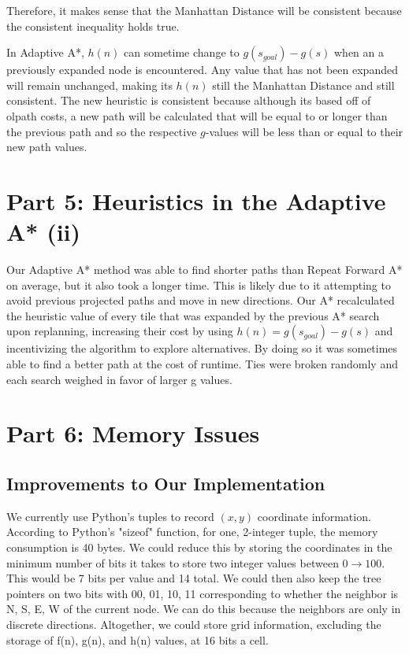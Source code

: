 \documentclass[a4paper,12pt]{article}
\begin{document}
Therefore, it makes sense that the Manhattan Distance will be consistent because the consistent inequality holds true. 

In Adaptive A*, $h(n)$ can sometime change to $g(s_{goal}) - g(s)$ when an a previously expanded node is encountered. Any value that has not been expanded will remain unchanged, making its $h(n)$ still the Manhattan Distance and still consistent. The new heuristic is consistent because although its based off of olpath costs, a new path will be calculated that will be equal to or longer than the previous path and so the respective $g$-values will be less than or equal to their new path values. 

\section{Part 5:  Heuristics in the Adaptive A* (ii)}
Our Adaptive A* method was able to find shorter paths than Repeat Forward A* on average, but it also took a longer time. This is likely due to it attempting to avoid previous projected paths and move in new directions. Our A* recalculated the heuristic value of every tile that was expanded by the previous A* search upon replanning, increasing their cost by using $h(n) = g(s_{goal}) - g(s)$ and incentivizing the algorithm to explore alternatives.  By doing so it was sometimes able to find a better path at the cost of runtime. Ties were broken randomly and each search weighed in favor of larger g values.

\section{Part 6: Memory Issues}

\subsection{Improvements to Our Implementation}
We currently use Python's tuples to record $(x , y)$ coordinate information. According to Python's "sizeof" function, for one, 2-integer tuple, the memory consumption is 40 bytes. We could reduce this by storing the coordinates in the minimum number of bits it takes to store two integer values between $0 \rightarrow 100$. This would be 7 bits per value and 14 total. We could then also keep the tree pointers on two bits with 00, 01, 10, 11 corresponding to whether the neighbor is N, S, E, W of the current node. We can do this because the neighbors are only in discrete directions. Altogether, we could store grid information, excluding the storage of f(n), g(n), and h(n) values, at 16 bits a cell. 
\end{document}

